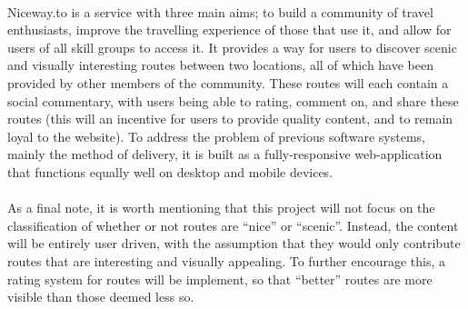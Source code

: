 \ \\
Niceway.to is a service with three main aims; to build a community of travel enthusiasts, improve the travelling experience of those that use it, and allow for users of all skill groups to access it. It provides a way for users to discover scenic and visually interesting routes between two locations, all of which have been provided by other members of the community. These routes will each contain a social commentary, with users being able to rating, comment on, and share these routes (this will an incentive for users to provide quality content, and to remain loyal to the website). To address the problem of previous software systems, mainly the method of delivery, it is built as a fully-responsive web-application that functions equally well on desktop and mobile devices. \ \\
\ \\
As a final note, it is worth mentioning that this project will not focus on the classification of whether or not routes are ``nice'' or ``scenic''. Instead, the content will be entirely user driven, with the assumption that they would only contribute routes that are interesting and visually appealing. To further encourage this, a rating system for routes will be implement, so that ``better'' routes are more visible than those deemed less so.
